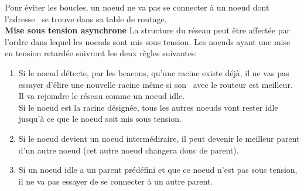         Pour éviter les boucles, un noeud ne va pas se connecter à un noeud dont l'adresse \mac\ se trouve dans sa table de routage.
        \vspace{0.5cm}\\
        \textbf{Mise sous tension asynchrone}\newline
            La structure du réseau peut être affectée par l'ordre dans lequel les noeuds sont mis sous tension.
            Les noeuds ayant une mise en tension retardée suivront les deux règles suivantes:
            \begin{enumerate}
                \item Si le noeud détecte, par les beacons, qu'une racine existe déjà, il ne vas pas essayer
                    d'élire une nouvelle racine
                    même si son \rssi\ avec le routeur est meilleur. Il va rejoindre le réseau comme un noeud idle.\\
                    Si le noeud est la racine désignée, tous les autres noeuds vont rester idle
                    jusqu'à ce que le noeud soit mis sous tension.
                \item Si le noeud devient un noeud intermédiraire, il peut devenir le meilleur parent d'un autre noeud 
                (cet autre noeud changera donc de parent).
                \item Si un noeud idle a un parent prédéfini et que ce noeud n'est pas sous tension, il ne va pas essayer
                de se connecter à un autre parent.
            \end{enumerate}
